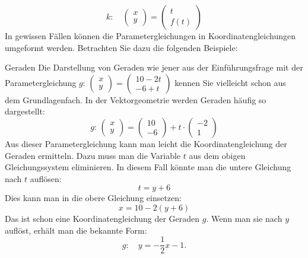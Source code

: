 \[
    k: \quad \begin{pmatrix}
        x \\y
    \end{pmatrix} = \begin{pmatrix}
        t \\
        f(t)
    \end{pmatrix}
\]
In gewissen Fällen können die Parametergleichungen in Koordinatengleichungen umgeformt werden. Betrachten Sie dazu die folgenden Beispiele:
\begin{bsp}{Geraden}{}
    Die Darstellung von Geraden wie jener aus der Einführungsfrage mit der Parametergleichung
    \(g: \, \begin{pmatrix}
        x \\y
    \end{pmatrix}
    = \begin{pmatrix}
        10 - 2t \\
        -6 + t
    \end{pmatrix}\) kennen Sie vielleicht schon aus dem Grundlagenfach. In der Vektorgeometrie werden Geraden häufig so dargestellt:
    \[g: \,\begin{pmatrix}
            x \\y
        \end{pmatrix}
        = \begin{pmatrix}
            10 \\
            -6
        \end{pmatrix}
        + t \cdot\begin{pmatrix}
            -2 \\1
        \end{pmatrix}
    \]
    Aus dieser Parametergleichung kann man leicht die Koordinatengleichung der Geraden ermitteln. Dazu muss man  die Variable \( t \) aus dem obigen Gleichungssystem eliminieren. In diesem Fall könnte man die untere Gleichung nach \( t \) auflösen:
    \[
        t = y + 6
    \]
    Dies kann man in die obere Gleichung einsetzen:
    \[
        x = 10 - 2(y + 6)
    \]
    Das ist schon eine Koordinatengleichung der Geraden \( g \). Wenn man sie nach \( y \) auflöst, erhält man die bekannte Form:
    \[
        g: \quad y = -\frac{1}{2} x - 1.
    \]


\end{bsp}
